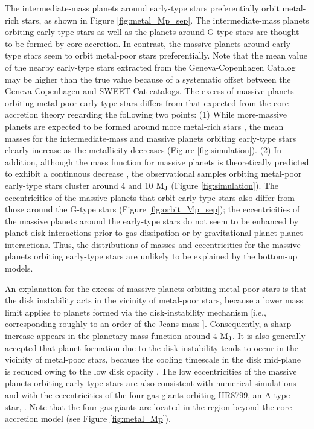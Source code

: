 \documentclass[twocolumn]{aastex62}
\begin{document}
\begin{CJK*}{UTF8}{min}
The intermediate-mass planets around early-type stars preferentially orbit metal-rich stars, as shown in Figure \ref{fig:metal_Mp_sep}. The intermediate-mass planets orbiting early-type stars as well as the planets around G-type stars are thought to be formed by core accretion. In contrast, the massive planets around early-type stars seem to orbit metal-poor stars preferentially. Note that the mean value of the nearby early-type stars extracted from the Geneva-Copenhagen Catalog may be higher than the true value because of a systematic offset between the Geneva-Copenhagen and SWEET-Cat catalogs. The excess of massive planets orbiting metal-poor early-type stars differs from that expected from the core-accretion theory regarding the following two points: (1) While more-massive planets are expected to be formed around more metal-rich stars \citep{2012A&A...541A..97M}, the mean masses for the intermediate-mass and massive planets orbiting early-type stars clearly increase as the metallicity decreases (Figure \ref{fig:simulation}). (2) In addition, although the mass function for massive planets is theoretically predicted to exhibit a continuous decrease \citep{2009A&A...501.1161M}, the observational samples orbiting metal-poor early-type stars cluster around 4 and 10 $\rm M_J$ (Figure \ref{fig:simulation}). The eccentricities of the massive planets that orbit early-type stars also differ from those around the G-type stars (Figure \ref{fig:orbit_Mp_sep}); the eccentricities of the massive planets around the early-type stars do not seem to be enhanced by planet-disk interactions prior to gas dissipation or by gravitational planet-planet interactions. Thus, the distributions of masses and eccentricities for the massive planets orbiting early-type stars are unlikely to be explained by the bottom-up models.

An explanation for the excess of massive planets orbiting metal-poor stars is that the disk instability acts in the vicinity of metal-poor stars, because a lower mass limit applies to planets formed via the disk-instability mechanism [i.e., corresponding roughly to an order of the Jeans mass \citep{2007ApJ...662.1282M, 2010Wiley}]. Consequently, a sharp increase appears in the planetary mass function around 4 $\rm M_J$. It is also generally accepted that planet formation due to the disk instability tends to occur in the vicinity of metal-poor stars, because the cooling timescale in the disk mid-plane is reduced owing to the low disk opacity \citep{2006ApJ...636L.149C, 2007Arizona}. The low eccentricities of the massive planets orbiting early-type stars are also consistent with numerical simulations \citep{2004ApJ...609.1045M, 2010Wiley, 2011ApJ...731...74B} and with the eccentricities of the four gas giants orbiting HR8799, an A-type star, \citep{2017A&A...598A..83W, 2018AJ....156..192W}. Note that the four gas giants are located in the region beyond the core-accretion model (see Figure \ref{fig:metal_Mp}).


\end{CJK*}
\end{document}
